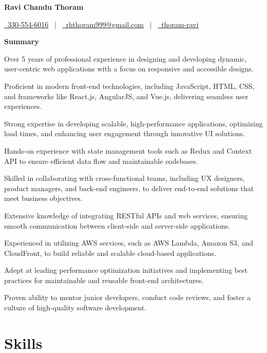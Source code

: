 \documentclass[11pt,a4paper]{article}
\newcommand{\documentTitle}[2]{%
  \begin{center}
    {\LARGE\bfseries #1\par}
    #2
  \end{center}
}
\newcommand{\tinysection}[1]{%
  \textbf{\large #1}\par
}
\newenvironment{resume_list}{%
  \begin{itemize}[leftmargin=1.5em, topsep=2pt, itemsep=0pt, parsep=0pt]
}{%
  \end{itemize}
}
\begin{document}
\raggedbottom

\documentTitle{Ravi Chandu Thoram}{
    \href{tel:2243864176}{\raisebox{-0.05\height}{\faPhone}~330-554-6016} ~|~
    \href{mailto:rhthoram999@gmail.com}{\raisebox{-0.15\height}{\faEnvelope}~rhthoram999@gmail.com} ~|~
    \href{https://www.linkedin.com/in/thoram-ravi/}{\raisebox{-0.15\height}{\faLinkedin}~thoram-ravi}
}

\tinysection{Summary}

\begin{resume_list}
    \item Over 5 years of professional experience in designing and developing dynamic, user-centric web applications with a focus on responsive and accessible designs.
    \item Proficient in modern front-end technologies, including JavaScript, HTML, CSS, and frameworks like React.js, AngularJS, and Vue.js, delivering seamless user experiences.
    \item Strong expertise in developing scalable, high-performance applications, optimizing load times, and enhancing user engagement through innovative UI solutions.
    \item Hands-on experience with state management tools such as Redux and Context API to ensure efficient data flow and maintainable codebases.
    \item Skilled in collaborating with cross-functional teams, including UX designers, product managers, and back-end engineers, to deliver end-to-end solutions that meet business objectives.
    \item Extensive knowledge of integrating RESTful APIs and web services, ensuring smooth communication between client-side and server-side applications.
    \item Experienced in utilizing AWS services, such as AWS Lambda, Amazon S3, and CloudFront, to build reliable and scalable cloud-based applications.
    \item Adept at leading performance optimization initiatives and implementing best practices for maintainable and reusable front-end architectures.
    \item Proven ability to mentor junior developers, conduct code reviews, and foster a culture of high-quality software development.
\end{resume_list}

\section*{Skills}
\end{document}
